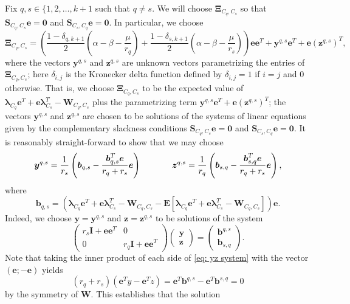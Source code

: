 \documentclass[twoside,11pt]{article}
\renewcommand{\S}{\mathbf{S}}
\newcommand{\E}{\mathbf{E}}
\renewcommand{\b}{{\bs{b}}}
\newcommand{\e}{\bs {e}}
\newcommand{\bs}{\boldsymbol}
\newcommand{\y}{\bs {y}}
\newcommand{\W}{\bs {W}}
\newcommand{\z}{\bs{z}}
\newcommand{\0}{\bs{0}}
\newcommand{\vect}[1] {\ensuremath{\left(\begin{array}{c} #1 \end{array} \right)}} %
\newcommand{\mat}[1] {\ensuremath{ \left(\begin{array} #1 \end{array} \right)}} %
\newcommand{\sbra}[1] {\ensuremath{ \left[ #1\right]}} %
\newcommand{\rbra}[1]{\ensuremath{\left( #1 \right)}} %
\newcommand{\eq}[1]{\(#1\)}
\begin{document}
{%
Fix \(q, s \in \{1,2,\dots, k+1\) such that \(q\neq s\).
We will choose \(\bs \Xi_{C_q, C_s} \) so that \(\S_{C_q, C_s}\e = \bs 0\) and \( \S_{C_s, C_q} \e = \bs 0 \).
In particular, we choose
\begin{equation} \label{eq: Xi choice 1}
\bs\Xi_{C_q, C_s} = \rbra{ \frac{1-\delta_{q, k+1}}{2}
\rbra{\alpha - \beta - \frac{\mu}{r_q}} +
\frac{1-\delta_{s, k+1}}{2}
\rbra{\alpha - \beta - \frac{\mu}{r_s}} } \e\e^T
+ \y^{q,s} \e^T + \e (\z^{q,s})^T,
\end{equation}
where the vectors \( \y^{q,s}\) and \(\z^{q,s}\) are unknown vectors parametrizing the entries of \(\bs\Xi_{C_q, C_s}\);
here 
\(\delta_{i,j}\) is the Kronecker delta function defined by \( \delta_{i,j} = 1 \) if \(i=j\)
	and \(0\) otherwise.
That is, we choose \(\bs\Xi_{C_q, C_s} \) to be the expected value of 
\( \bs \lambda_{C_q} \e^T + \e \bs \lambda_{C_s}^T
- \W_{C_q, C_s} \) plus the parametrizing term \(\y^{q,s} \e^T + \e (\z^{q,s})^T\); the vectors  
\( \y^{q,s}\) and \(\z^{q,s}\) are chosen to be solutions of the systems of linear equations given
by the complementary slackness conditions
\(\S_{C_q, C_s}\e = \bs 0\) and \( \S_{C_s, C_q} \e = \bs 0 \).
It is reasonably straight-forward to show that we may choose
\begin{equation} \label{eq: y z}
\y^{q,s} = \frac{1}{r_s} \rbra{ \b_{q,s} - \frac{\b_{q,s}^T \e }{r_q + r_s} \e }
\hspace{0.5in}
\z^{q,s} = \frac{1}{r_q} \rbra{ \b_{s,q} - \frac{\b_{s,q}^T \e}{r_q + r_s} \e },
\end{equation}
where
\begin{equation} \label{eq: b}
\b_{q,s} = \rbra{ \bs \lambda_{C_q} \e^T + \e \bs \lambda_{C_s}^T
- \W_{C_q, C_s} - \E\sbra{\bs \lambda_{C_q} \e^T + \e \bs \lambda_{C_s}^T
- \W_{C_q, C_s}} } \e.
\end{equation}
Indeed, we choose $\y = \y^{q,s}$ and $\z = \z^{q,s}$
to be solutions of the system
\newcommand{\I}{\bs I}
\begin{equation} \label{eq: yz system}
	\mat{{cc} r_s \I + \e\e^T & 0 \\ 0 & r_q \I + \e\e^T }
	\vect{ \y \\ \z } = \vect{\b^{q,s} \\ \b_{s,q} }.
\end{equation}
Note that taking the inner product of each side 
of \eqref{eq: yz system} with the vector \( (\e; -\e) \)
yields
\[
	(r_q + r_s)( \e^T y -  \e^T z) = \e^T \b^{q,s} - \e^T \b^{s,q}
	= 0
\]
by the symmetry of \eq{\W}. This establishes that the solution
}
\end{document}
